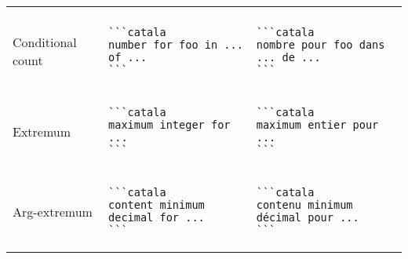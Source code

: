 \documentclass[a3paper,landscape]{article}
\begin{document}
\begin{multicols*}{2}
\begin{center}
\begin{tabular}{p{}p{}p{}}
\vspace*{-1.75em}
\\
Conditional count&
\vspace*{-1.75em}
\begin{verbatim}
```catala
number for foo in ... of ...
```
\end{verbatim}
\vspace*{-1.75em}
&
\vspace*{-1.75em}
\begin{verbatim}
```catala
nombre pour foo dans ... de ...
```
\end{verbatim}
\vspace*{-1.75em}
\\
Extremum&
\vspace*{-1.75em}
\begin{verbatim}
```catala
maximum integer for ...
```
\end{verbatim}
\vspace*{-1.75em}
&
\vspace*{-1.75em}
\begin{verbatim}
```catala
maximum entier pour ...
```
\end{verbatim}
\vspace*{-1.75em}
\\
Arg-extremum&
\vspace*{-1.75em}
\begin{verbatim}
```catala
content minimum decimal for ...
```
\end{verbatim}
\vspace*{-1.75em}
&
\vspace*{-1.75em}
\begin{verbatim}
```catala
contenu minimum décimal pour ...
```
\end{verbatim}
\vspace*{-1.75em}
\\
\bottomrule
\end{tabular}
\end{center}



\end{multicols*}
\end{document}
